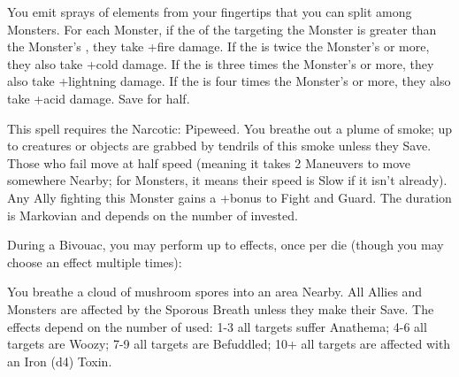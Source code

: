 {\MYSTERY [
  Name = Elemental Spray,
  Link = arcana-mystery-elemental-spray,
  Paradigm = Elements,
  Save = Y (half),
  Duration = Instant,
  Target = Close or Nearby Target(s)
]

You emit \DICE sprays of elements from your fingertips that you can split among \DICE Monsters.  For each Monster, if the \SUMDICE of the \DICE targeting the Monster is greater than the Monster's \HD, they take \DICE+\DICE fire damage.  If the \SUMDICE is twice the Monster's \HD or more, they also take \DICE+\DICE cold damage.  If the \SUMDICE is three times the Monster's \HD or more, they also take \DICE+\DICE lightning damage.  If the \SUMDICE is four times the Monster's \HD or more, they also take \DICE+\DICE acid damage.  Save for half.

\MYSTERY [
  Name = Entangling Smoke ,
  Link = arcana-mystery-entangling-smoke,
  Paradigm = Elements,
  Save = Y (neg.),
  Duration = Markovian,
  Target = Close or Nearby Target(s)
]

This spell requires the Narcotic: Pipeweed.  You breathe out a plume of smoke; up to \DICE creatures or objects are grabbed by tendrils of this smoke unless they Save.  Those who fail move at half speed (meaning it takes 2 Maneuvers to move somewhere Nearby; for Monsters, it means their speed is Slow if it isn't already).  Any Ally fighting this Monster gains a +\DICE bonus to Fight and Guard. The duration is Markovian and depends on the number of \DICE invested.

\MYSTERY [
  Name = Hearthfire,
  Link = arcana-mystery-hearthfire,
  Paradigm = Elements,
  Save = n/a,
  Duration = Bivouac,
  Target = Close Target(s)
]

During a Bivouac, you may perform up to \DICE effects, once per die (though you may choose an effect multiple times):

\MYSTERY [
  Name = Sporous Breath,
  Link = arcana-mystery-sporous-breath,
  Paradigm = Biomancy,
  Save = Y (neg.),
  Duration = Combat or \SUM Minutes,
  Target = Nearby Target(s)
]

You breathe a cloud of mushroom spores into an area Nearby.  All Allies and Monsters are affected by the Sporous Breath unless they make their Save.  The effects depend on the number of \DICE used: 1-3 all targets suffer Anathema; 4-6 all targets are Woozy; 7-9 all targets are Befuddled; 10+ all targets are affected with an Iron (d4) Toxin.

}
